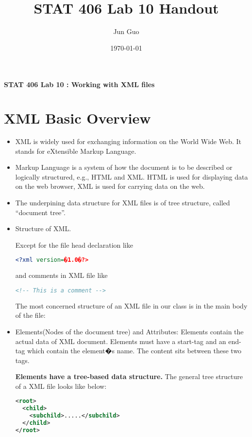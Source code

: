 \documentclass[12pt]{article}
\title{\textbf{STAT 406 Lab 10 Handout}}
\author{Jun Guo}
\date{\today}
\numberwithin{equation}{subsection}
\begin{document}
\begin{center}
\large
\textbf{STAT 406 Lab 10 : Working with XML files}
\end{center}\vspace*{5mm}

\section{XML Basic Overview}
\begin{itemize}
	\item XML is widely used for exchanging information on the World Wide
Web. It stands for eXtensible Markup Language. 

\item Markup Language is a system of how the document is to be described or
logically structured, e.g., HTML and XML.
HTML is used for displaying data on the web browser,
XML is used for carrying data on the web.

\item The underpining data structure for XML files is of tree structure, called ``document tree''.

\item Structure of XML. 

Except for the file head declaration like 
\begin{lstlisting}[style=displaycode, language=XML]
<?xml version=�1.0�?>
\end{lstlisting} and comments in XML file like
\begin{lstlisting}[style=displaycode, language=XML]
<!-- This is a comment -->
\end{lstlisting}
The most concerned structure of an XML file in our class is in the main body of the file:

\item Elements(Nodes of the document tree) and Attributes: Elements contain the actual data of XML document. Elements
must have a start-tag and an end-tag which contain the element�s
name. The content sits between these two tags. 

\textbf{Elements have a
tree-based data structure.} \newline
The general tree structure of a XML file looks like below:

\begin{lstlisting}[style=displaycode, language=XML]
<root>
  <child>
    <subchild>.....</subchild>
  </child>
</root>
\end{lstlisting}


\end{itemize}
\end{document}
